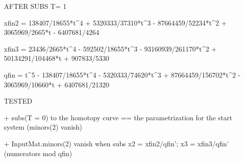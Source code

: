 AFTER SUBS T= 1

xfin2 = 138407/18655*t^4 + 5320333/37310*t^3 - 87664459/52234*t^2 + 3065969/2665*t - 6407681/4264

xfin3 = 23436/2665*t^4 - 592502/18655*t^3 - 93160939/261170*t^2 + 50134291/104468*t + 907833/5330

qfin = t^5 - 138407/18655*t^4 - 5320333/74620*t^3 + 87664459/156702*t^2 - 3065969/10660*t + 6407681/21320


TESTED

+ subs(T = 0) to the homotopy curve == the parametrization for the start system (minors(2) vanish)

+ InputMat.minors(2) vanish when subs x2 = xfin2/qfin'; x3 = xfin3/qfin' (numerators mod qfin) 


























